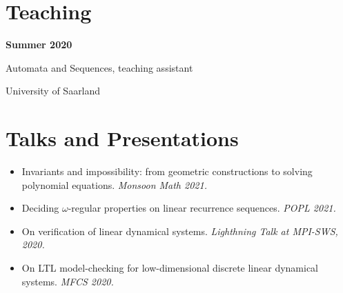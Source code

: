 \documentclass{article}
\begin{document}
	\section*{Teaching}
	\noindent\begin{minipage}{0.3\textwidth}
		\hspace{0.5cm} \textbf{Summer 2020}
	\end{minipage}
	\begin{minipage}{0.7\textwidth}
		Automata and Sequences, teaching assistant 
		
		University of Saarland
	\end{minipage}

	\section*{Talks and Presentations}
	\begin{itemize}
		\item Invariants and impossibility: from geometric constructions to solving polynomial equations. \emph{Monsoon Math 2021.}
		\item Deciding $\omega$-regular properties on linear recurrence sequences. \emph{POPL 2021.}
		\item On verification of linear dynamical systems. \emph{Lighthning Talk at MPI-SWS, 2020.}
		\item  On LTL model-checking for low-dimensional discrete
		linear dynamical systems. \emph{MFCS 2020.}
	\end{itemize}
\end{document}
